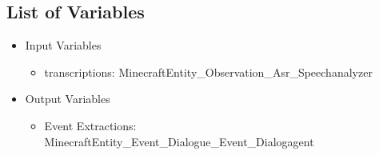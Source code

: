 
\subsection{List of Variables}

\begin{itemize}
    \item Input Variables
    \begin{itemize}
        \item transcriptions: MinecraftEntity\_Observation\_Asr\_Speechanalyzer
    \end{itemize}
    \item Output Variables
    \begin{itemize}
        \item Event Extractions: MinecraftEntity\_Event\_Dialogue\_Event\_Dialogagent
    \end{itemize}
\end{itemize}

